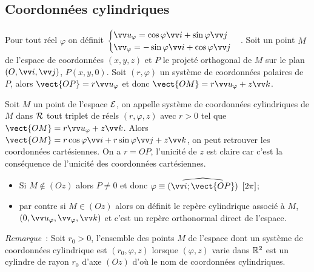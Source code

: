 \subsection{Coordonnées cylindriques}
\label{subsec:coordcyl}
Pour tout réel $\varphi$ on définit $\begin{cases}\vu_\varphi=\cos\varphi\vi+\sin\varphi\vj\\ \vv_\varphi=-\sin\varphi\vi+\cos\varphi\vj\end{cases}$. Soit un point $M$ de l'espace de coordonnées $(x,y,z)$ et $P$ le projeté orthogonal de $M$ sur le plan $\rond$, $P(x,y,0)$. Soit $(r,\varphi)$ un système de coordonnées polaires de $P$, alors $\vect{OP}=r\vu_\varphi$ et donc $\vect{OM}=r\vu_\varphi+z\vk$.
\begin{defdef}
  Soit $M$ un point de l'espace $\mathcal{E}$, on appelle système de coordonnées cylindriques de $M$ dans $\mathcal{R}$ tout triplet de réels $(r,\varphi,z)$ avec $r>0$ tel que $\vect{OM}=r\vu_\varphi+z\vk$. Alors $\vect{OM}=r\cos\varphi\vi+r\sin\varphi\vj+z\vk$, on peut retrouver les coordonnées cartésiennes. On a $r=OP$, l'unicité de $z$ est claire car c'est la conséquence de l'unicité des coordonnées cartésiennes. 
\begin{itemize}
\item Si $M\notin(Oz)$ alors $P\neq 0$ et donc $\congru{\varphi}{\widehat{(\vi;\vect{OP})}}{2\pi}$;
\item par contre si $M\in(Oz)$ alors on définit le repère cylindrique associé à $M$, $(0,\vu_\varphi,\vv_\varphi,\vk)$ et c'est un repère orthonormal direct de l'espace.
\end{itemize}
\end{defdef}

\emph{Remarque}~: Soit $r_0>0$, l'ensemble des points $M$ de l'espace dont un système de coordonnées cylindrique est $(r_0,\varphi,z)$ lorsque $(\varphi,z)$ varie dans $\mathbb{R}^2$ est un cylindre de rayon $r_0$ d'axe $(Oz)$ d'où le nom de coordonnées cylindriques.

